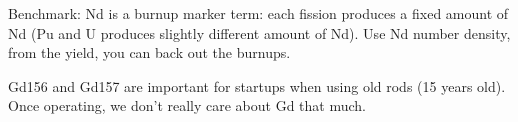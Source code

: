 \documentclass{school-22.211-notes}
\begin{document}
Benchmark: Nd is a burnup marker term: each fission produces a fixed amount of Nd (Pu and U produces slightly different amount of Nd). Use Nd number density, from the yield, you can back out the burnups. 

Gd156 and Gd157 are important for startups when using old rods (15 years old). Once operating, we don't really care about Gd that much. 
\end{document}
